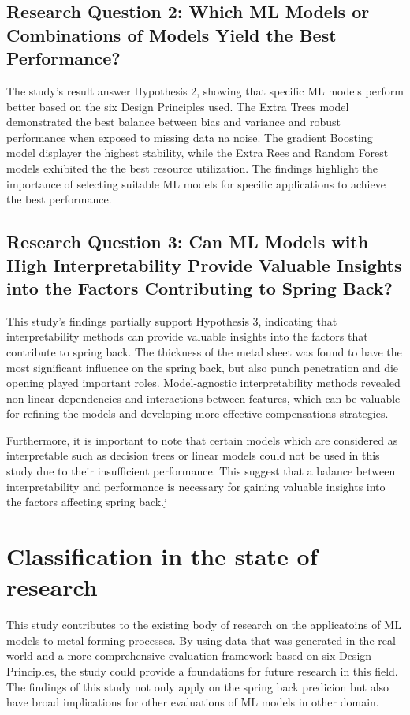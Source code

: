 \subsection{Research Question 2: Which ML Models or Combinations of Models Yield the Best Performance?}
\label{subsec:research-question-2:-which-ml-models-or-combinations-of-models-yield-the-best-performance?}
The study's result answer Hypothesis 2, showing that specific \ac{ML} models perform better based on the six Design
Principles used.
The Extra Trees model demonstrated the best balance between bias and variance and robust performance when exposed to
missing data na noise.
The gradient Boosting model displayer the highest stability, while the Extra Rees and Random Forest models exhibited the
the best resource utilization.
The findings highlight the importance of selecting suitable \ac{ML} models for specific applications to achieve the
best performance.

\subsection{Research Question 3: Can ML Models with High Interpretability Provide Valuable Insights into the Factors
Contributing to Spring Back?}
\label{subsec:research-question-3:-can-ml-models-with-high-interpretability-provide
-valuable-insights-into-the-factors-
contributing-to-spring-back?}
This study's findings partially support Hypothesis 3, indicating that interpretability methods can provide valuable
insights into the factors that contribute to spring back.
The thickness of the metal sheet was found to have the most significant influence on the spring back, but also punch
penetration and die opening played important roles.
Model-agnostic interpretability methods revealed non-linear dependencies and interactions between features, which can
be valuable for refining the models and developing more effective compensations strategies.

Furthermore, it is important to note that certain models which are considered as interpretable such as decision trees
or linear models could not be used in this study due to their insufficient performance.
This suggest that a balance between interpretability and performance is necessary for gaining valuable insights into
the factors affecting spring back.j


\section{Classification in the state of research}\label{sec:classification-in-the-state-of-research}
This study contributes to the existing body of research on the applicatoins of ML models to metal forming processes.
By using data that was generated in the real-world and a more comprehensive evaluation framework based on six Design
Principles, the study could provide a foundations for future research in this field.
The findings of this study not only apply on the spring back predicion but also have broad implications for other
evaluations of ML models in other domain.



